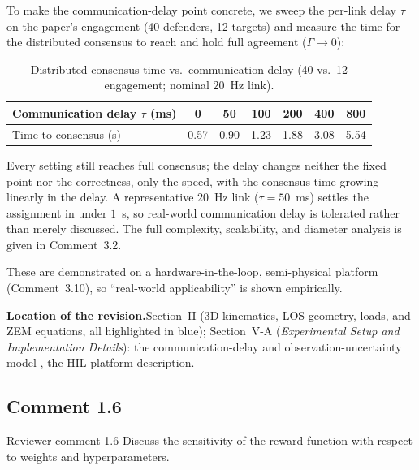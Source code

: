 \documentclass[11pt]{article}
\newcommand{\loc}{\medskip\noindent\textbf{Location of the revision.}\quad}
\begin{document}
To make the communication-delay point concrete, we sweep the per-link delay $\tau$ on the
paper's engagement (40 defenders, 12 targets) and measure the time for the distributed
consensus to reach and hold full agreement ($\Gamma\!\to\!0$):

\begin{table}[h]
\centering
\captionsetup{font=small}
\caption*{\small Distributed-consensus time vs.\ communication delay (40 vs.\ 12
engagement; nominal $20$~Hz link).}
\begin{tabular}{lcccccc}
\toprule
Communication delay $\tau$ (ms) & 0 & 50 & 100 & 200 & 400 & 800 \\
\midrule
Time to consensus (s) & 0.57 & 0.90 & 1.23 & 1.88 & 3.08 & 5.54 \\
\bottomrule
\end{tabular}
\end{table}

\noindent Every setting still reaches full consensus; the delay changes neither the fixed
point nor the correctness, only the speed, with the consensus time growing linearly in the
delay. A representative $20$~Hz link ($\tau=50$~ms) settles the assignment in under $1$~s,
so real-world communication delay is tolerated rather than merely discussed. The full
complexity, scalability, and diameter analysis is given in Comment~3.2.

These are demonstrated on a hardware-in-the-loop, semi-physical platform (Comment~3.10),
so ``real-world applicability'' is shown empirically.

\loc Section~II (3D kinematics, LOS geometry, loads, and ZEM equations, all highlighted
in blue); Section~V-A (\emph{Experimental Setup and Implementation Details}): the
communication-delay and observation-uncertainty model , the HIL
platform description.

\clearpage

\subsection*{Comment 1.6}

\begin{reviewercomment}{Reviewer comment 1.6}
Discuss the sensitivity of the reward function with respect to weights and
hyperparameters.
\end{reviewercomment}
\end{document}
